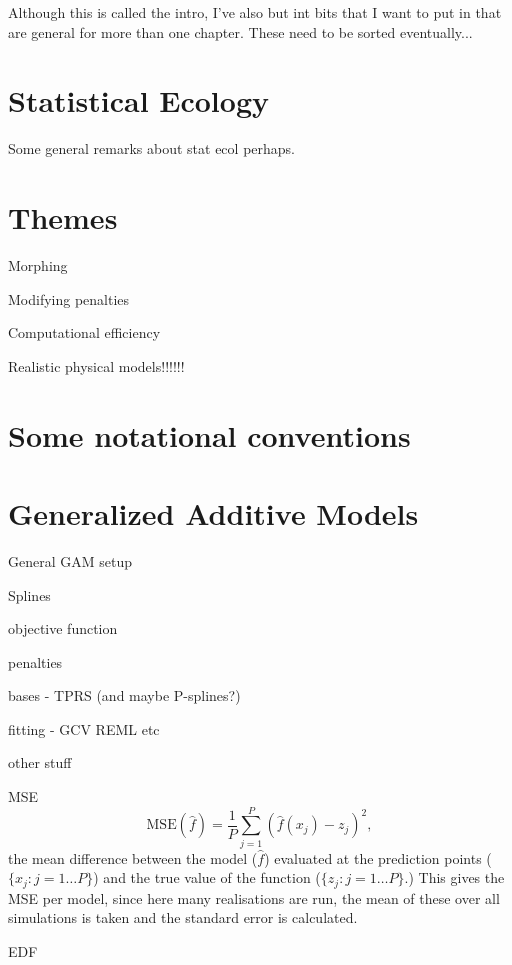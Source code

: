 Although this is called the intro, I've also but int bits that I want to put in that are general for more than one chapter. These need to be sorted eventually...

\section{Statistical Ecology}

Some general remarks about stat ecol perhaps.

\section{Themes}

\bi
	\item Morphing
	\item Modifying penalties
	\item Computational efficiency
	\item Realistic physical models!!!!!!
\ei


\section{Some notational conventions}



\section{Generalized Additive Models}

General GAM setup

\bi
\item Splines
\item objective function
\label{GAMobjfcn}
\item penalties
\label{GAMpenalties}
\item bases - TPRS (and maybe P-splines?)
\item fitting - GCV REML etc
\item other stuff
	\bi
	\item MSE
	\begin{equation}
\text{MSE}(\hat{f}) = \frac{1}{P} \sum_{j=1}^P (\hat{f}(x_j) - z_j)^2,
\end{equation}
the mean difference between the model ($\hat{f}$) evaluated at the prediction points ($\{x_j : j=1 \dots P\}$) and the true value of the function ($\{z_j : j=1 \dots P\}$.) This gives the MSE per model, since here many realisations are run, the mean of these over all simulations is taken and the standard error is calculated.
	\item EDF
	

